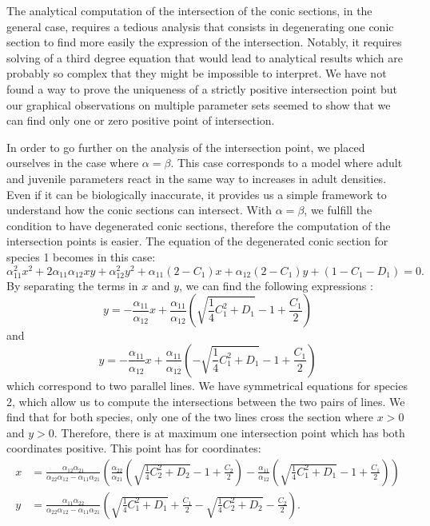 \documentclass{article}
\begin{document}
The analytical computation of the intersection of the conic sections, in the general case, requires a tedious analysis that consists in degenerating one conic section to find more easily the expression of the intersection.  Notably, it requires solving of a third degree equation that would lead to analytical results which are probably so complex that they might be impossible to interpret. 
We have not found a way to prove the uniqueness of a strictly positive intersection point but our graphical observations on multiple parameter sets seemed to show that we can find only one or zero positive point of intersection. 

In order to go further on the analysis of the intersection point, we placed ourselves in the case where $\alpha = \beta$. This case corresponds to a model where adult and juvenile parameters react in the same way to increases in adult densities. Even if it can be biologically inaccurate, it provides us a simple framework to understand how the conic sections can intersect.
With $\alpha=\beta$, we fulfill the condition to have degenerated conic sections, therefore the computation of the intersection points is easier. The equation of the degenerated conic section for species 1 becomes in this case:
\begin{equation}
    \alpha_{11}^2x^2+2\alpha_{11}\alpha_{12}xy + \alpha_{12}^2y^2 + \alpha_{11}(2-C_1)x + \alpha_{12}(2-C_1)y + (1-C_1-D_1) = 0.
\end{equation}
By separating the terms in $x$ and $y$, we can find the following expressions :
\begin{equation}
    y = -\frac{\alpha_{11}}{\alpha_{12}}x+\frac{\alpha_{11}}{\alpha_{12}}\left(\sqrt{\frac{1}{4}C_1^2+D_1}-1 + \frac{C_1}{2}\right)
\end{equation}
and
\begin{equation}
    y = -\frac{\alpha_{11}}{\alpha_{12}}x+\frac{\alpha_{11}}{\alpha_{12}}\left(-\sqrt{\frac{1}{4}C_1^2+D_1}-1 + \frac{C_1}{2}\right)
\end{equation}
which correspond to two parallel lines.
We have symmetrical equations for species 2, which allow us to compute the intersections between the two pairs of lines.
We find that for both species, only one of the two lines cross the section where $x>0$ and $y>0$. Therefore, there is at maximum one intersection point which has both coordinates positive. 
This point has for coordinates:
\begin{align}
    x &= \frac{\alpha_{12}\alpha_{21}}{\alpha_{22}\alpha_{12}-\alpha_{11}\alpha_{21}}\left(\frac{\alpha_{22}}{\alpha_{21}}\left(\sqrt{\frac{1}{4}C_2^2+D_2}-1 + \frac{C_2}{2}\right)-\frac{\alpha_{11}}{\alpha_{12}}\left(\sqrt{\frac{1}{4}C_1^2+D_1}-1 + \frac{C_1}{2}\right)\right)\\
    y &= \frac{\alpha_{11}\alpha_{22}}{\alpha_{22}\alpha_{12}-\alpha_{11}\alpha_{21}}\left(\sqrt{\frac{1}{4}C_1^2+D_1}+\frac{C_1}{2}-\sqrt{\frac{1}{4}C_2^2+D_2}-\frac{C_2}{2}\right).
\end{align}
\end{document}

